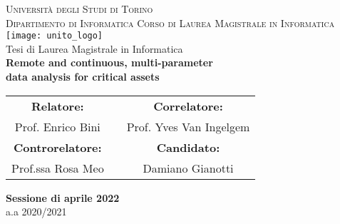 \begin{titlepage}
    \thispagestyle{empty}
    \begin{center}
        \LARGE{\textsc{Università degli Studi di Torino}}                               \\
        \Large{\textsc{Dipartimento di Informatica}}
        \vskip 20pt
        \large{\textsc{Corso di Laurea Magistrale in Informatica}}                      \\
        \vskip 20pt
        \texttt{[image: unito\_logo]}                                         \\
        \vskip 10pt
        \large{Tesi di Laurea Magistrale in Informatica}                                \\
        \vskip 50pt
        \LARGE{\textbf{Remote and continuous, multi-parameter}}                         \\
        \LARGE{\textbf{data analysis for critical assets}}                              \\
        \vskip 50pt
        \begin{tabularx}{\textwidth}{cXc}
            \Large{\textbf{Relatore:}}       &  & \Large{\textbf{Correlatore:}}   \\
            \Large{Prof. Enrico Bini}        &  & \Large{Prof. Yves Van Ingelgem} \\
            \Large{\textbf{Controrelatore:}} &  & \Large{\textbf{Candidato:}}     \\
            \Large{Prof.ssa Rosa Meo}        &  & \Large{Damiano Gianotti}        \\
        \end{tabularx}
        \vskip 20pt
        \vskip 40pt
        \textbf{Sessione di aprile 2022}                                               \\
        a.a 2020/2021
    \end{center}
\end{titlepage}
\cleardoublepage
